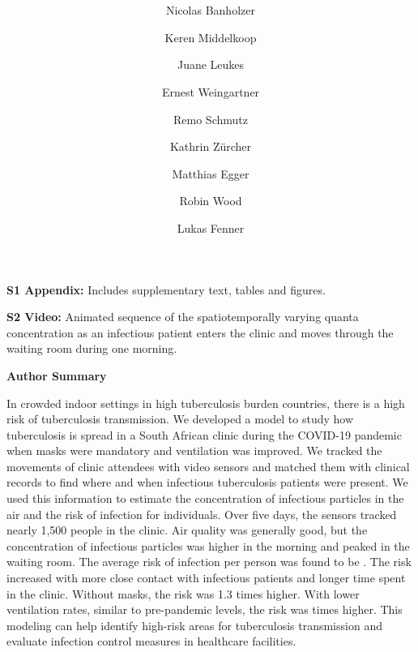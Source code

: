 \documentclass[fleqn,11pt]{wlscirep}
\begin{document}
\doublespacing

\title{\bfseries\LARGE{}}
\author[1]{Nicolas Banholzer}
\author[2]{Keren Middelkoop}
\author[2]{Juane Leukes}
\author[3]{Ernest Weingartner}
\author[1]{Remo Schmutz}
\author[1]{Kathrin Zürcher}
\author[1,4,5]{Matthias Egger}
\author[2]{Robin Wood}
\author[1*]{Lukas Fenner}



\vspace{1em}

\begin{information}

\noindent\noindent\textbf{S1 Appendix:} Includes supplementary text, tables and figures.

\noindent\textbf{S2 Video:} Animated sequence of the spatiotemporally varying quanta concentration as an infectious patient enters the clinic and moves through the waiting room during one morning.

\clearpage

\noindent\large{\textbf{Author Summary}}

\noindent In crowded indoor settings in high tuberculosis burden countries, there is a high risk of tuberculosis transmission. We developed a model to study how tuberculosis is spread in a South African clinic during the COVID-19 pandemic when masks were mandatory and ventilation was improved. We tracked the movements of clinic attendees with video sensors and matched them with clinical records to find where and when infectious tuberculosis patients were present. We used this information to estimate the concentration of infectious particles in the air and the risk of infection for individuals. Over five days, the sensors tracked nearly 1,500 people in the clinic. Air quality was generally good, but the concentration of infectious particles was higher in the morning and peaked in the waiting room. The average risk of infection per person was found to be . The risk increased with more close contact with infectious patients and longer time spent in the clinic. Without masks, the risk was 1.3 times higher. With lower ventilation rates, similar to pre-pandemic levels, the risk was  times higher. This modeling can help identify high-risk areas for tuberculosis transmission and evaluate infection control measures in healthcare facilities.

\end{information}
\end{document}
